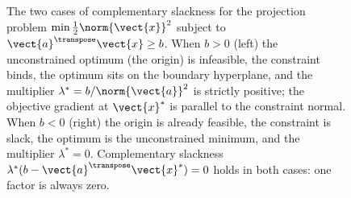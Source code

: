 \begin{figure}[ht]
\begin{tikzpicture}[x=1cm, y=1cm, font=\small]
\end{tikzpicture}
\caption[KKT geometry: active and inactive inequality
constraints]{The two cases of complementary slackness for the
projection problem $\min \tfrac{1}{2}\norm{\vect{x}}^{2}$ subject
to $\vect{a}^{\transpose}\vect{x} \geq b$. When $b > 0$ (left) the
unconstrained optimum (the origin) is infeasible, the constraint
binds, the optimum sits on the boundary hyperplane, and the
multiplier $\lambda^{*} = b/\norm{\vect{a}}^{2}$ is strictly
positive; the objective gradient at $\vect{x}^{*}$ is parallel to
the constraint normal. When $b < 0$ (right) the origin is already
feasible, the constraint is slack, the optimum is the
unconstrained minimum, and the multiplier $\lambda^{*} = 0$.
Complementary slackness $\lambda^{*}(b - \vect{a}^{\transpose}
\vect{x}^{*}) = 0$ holds in both cases: one factor is always zero.}
\label{fig:vol02:ch15:kkt-geometry}
\end{figure}
